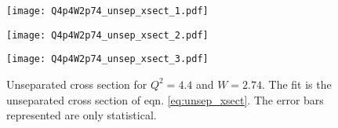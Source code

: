\begin{figure}
  \centering
    \begin{minipage}[b]{0.48\linewidth}
      \texttt{[image: Q4p4W2p74\_unsep\_xsect\_1.pdf]}
    \end{minipage}
    \hfill
    \begin{minipage}[b]{0.48\linewidth}
      \texttt{[image: Q4p4W2p74\_unsep\_xsect\_2.pdf]}
    \end{minipage}
    \begin{minipage}[b]{0.48\linewidth}
      \texttt{[image: Q4p4W2p74\_unsep\_xsect\_3.pdf]}
    \end{minipage}
  \caption{Unseparated cross section for $Q^2=4.4$ and $W=2.74$. The fit is the unseparated cross section of eqn. \ref{eq:unsep_xsect}. The error bars represented are only statistical.}
  \label{fig:Q4p4W2p74_unsep_xsect}
\end{figure}

